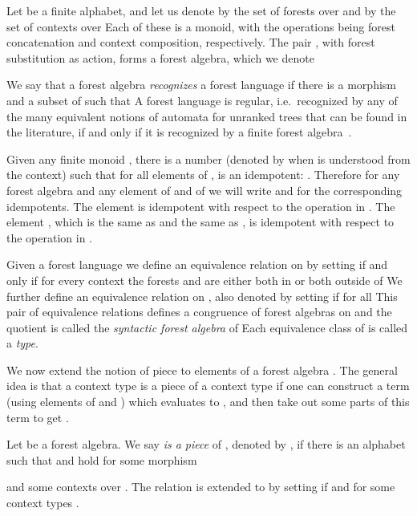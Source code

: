 \documentclass{LMCS}
\begin{document}
 Let  be a finite alphabet, and let us denote by  the set of
 forests over  and by  the set of contexts over  Each of
 these is a monoid, with the operations being forest concatenation and
 context composition, respectively. The pair , with forest
 substitution as action, forms a forest algebra, which we denote
 



 We say that a forest algebra  {\it recognizes} a forest
 language  if there is a morphism
  and a subset  of  such that
  A forest language is regular, i.e.~recognized by any of the many equivalent notions of automata for unranked trees that can be found in the literature, if and only if it is
 recognized by a finite forest algebra~\cite{forestalgebra}.

 Given any finite monoid , there is a number  (denoted by
  when  is understood from the context) such that for all elements
  of ,  is an idempotent: .
 Therefore for any forest algebra  and any element  of  and  of
  we will write  and  for the corresponding
 idempotents. The element  is idempotent with respect to the
 operation in . The element , which is the same as
  and the same as , is idempotent with
 respect to the operation in .


 Given a forest language  we define an equivalence relation  on
  by setting  if and only if for every context  the forests  and  are either both in  or both outside of 
 We further define an equivalence relation on , also denoted
  by setting  if for all   This pair of equivalence relations defines a congruence of
 forest algebras on  and the quotient  is
 called the {\it syntactic forest algebra} of  Each equivalence
 class of  is called a \emph{type}.


 We now extend the notion of piece to elements of a forest algebra . The
 general idea is that a context type  is a piece of a context type  if
 one can construct a term (using elements of  and ) which evaluates to
 , and then take out some parts of this term to get .
\begin{def}\label{df:piece-alg}
  Let  be a forest algebra. We say  \emph{is a piece}
  of , denoted by , if there is an alphabet 
  such that  and  hold for some morphism
  
  and some contexts  over .  The relation  is
  extended to  by setting  if  and  for
  some context types .
\end{def}
\end{document}
